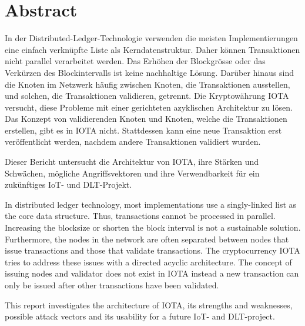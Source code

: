 \chapter*{Abstract}


In der Distributed-Ledger-Technologie verwenden die meisten Implementierungen eine einfach verkn\"upfte Liste als Kerndatenstruktur. Daher k\"onnen Transaktionen nicht parallel verarbeitet werden. Das Erh\"ohen der Blockgr\"osse oder das Verk\"urzen des Blockintervalls ist keine nachhaltige L\"osung. Dar\"uber hinaus sind die Knoten im Netzwerk h\"aufig zwischen Knoten, die Transaktionen ausstellen, und solchen, die Transaktionen validieren, getrennt. Die Kryptow\"ahrung IOTA versucht, diese Probleme mit einer gerichteten azyklischen Architektur zu l\"osen. Das Konzept von validierenden Knoten und Knoten, welche die Transaktionen erstellen, gibt es in IOTA nicht. Stattdessen kann eine neue Transaktion erst ver\"offentlicht werden, nachdem andere Transaktionen validiert wurden.

Dieser Bericht untersucht die Architektur von IOTA, ihre St\"arken und Schw\"achen, m\"ogliche Angriffsvektoren und ihre Verwendbarkeit f\"ur ein zuk\"unftiges IoT- und DLT-Projekt.

 

In distributed ledger technology, most implementations use a singly-linked list as the core data structure. Thus, transactions cannot be processed in parallel. Increasing the blocksize or shorten the block interval is not a sustainable solution. Furthermore, the nodes in the network are often separated between nodes that issue transactions and those that validate transactions. The cryptocurrency IOTA tries to address these issues with a directed acyclic architecture. The concept of issuing nodes and validator does not exist in IOTA instead a new transaction can only be issued after other transactions have been validated.

This report investigates the architecture of IOTA, its strengths and weaknesses, possible attack vectors and its usability for a future IoT- and DLT-project.
